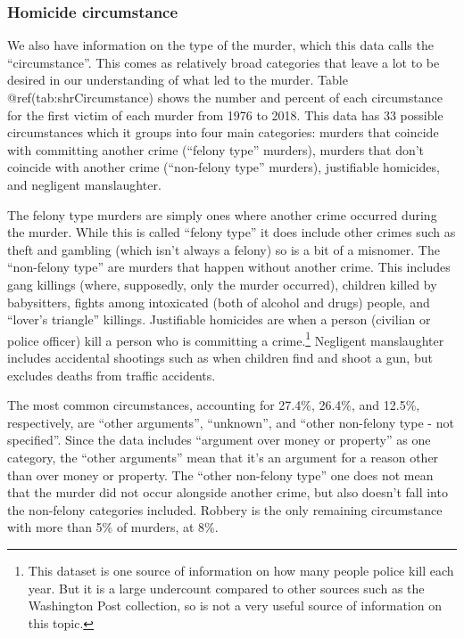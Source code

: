 \documentclass[
  12pt,
  openany]{book}
\begin{document}
\hypertarget{circumstance}{%
\subsubsection{Homicide circumstance}\label{circumstance}}

We also have information on the type of the murder, which this data calls the ``circumstance''. This comes as relatively broad categories that leave a lot to be desired in our understanding of what led to the murder. Table @ref(tab:shrCircumstance) shows the number and percent of each circumstance for the first victim of each murder from 1976 to 2018. This data has 33 possible circumstances which it groups into four main categories: murders that coincide with committing another crime (``felony type'' murders), murders that don't coincide with another crime (``non-felony type'' murders), justifiable homicides, and negligent manslaughter.

The felony type murders are simply ones where another crime occurred during the murder. While this is called ``felony type'' it does include other crimes such as theft and gambling (which isn't always a felony) so is a bit of a misnomer. The ``non-felony type'' are murders that happen without another crime. This includes gang killings (where, supposedly, only the murder occurred), children killed by babysitters, fights among intoxicated (both of alcohol and drugs) people, and ``lover's triangle'' killings. Justifiable homicides are when a person (civilian or police officer) kill a person who is committing a crime.\footnote{This dataset is one source of information on how many people police kill each year. But it is a large undercount compared to other sources such as the Washington Post collection, so is not a very useful source of information on this topic.} Negligent manslaughter includes accidental shootings such as when children find and shoot a gun, but excludes deaths from traffic accidents.

The most common circumstances, accounting for 27.4\%, 26.4\%, and 12.5\%, respectively, are ``other arguments'', ``unknown'', and ``other non-felony type - not specified''. Since the data includes ``argument over money or property'' as one category, the ``other arguments'' mean that it's an argument for a reason other than over money or property. The ``other non-felony type'' one does not mean that the murder did not occur alongside another crime, but also doesn't fall into the non-felony categories included. Robbery is the only remaining circumstance with more than 5\% of murders, at 8\%.
\end{document}
